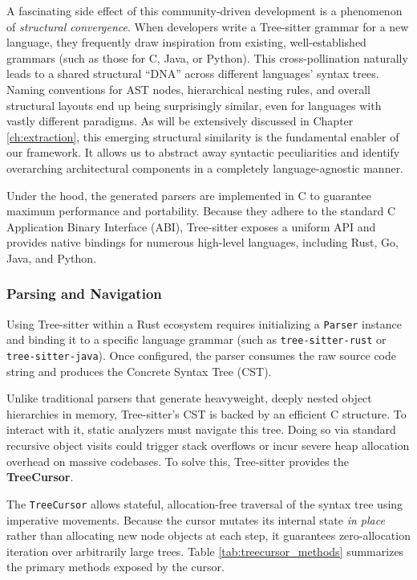 A fascinating side effect of this community-driven development is a
phenomenon of \textit{structural convergence}. When developers write a
Tree-sitter grammar for a new language, they frequently draw
inspiration from existing, well-established grammars (such as those
for C, Java, or Python). This cross-pollination naturally leads to a
shared structural ``DNA'' across different languages' syntax trees.
Naming conventions for AST nodes, hierarchical nesting rules, and
overall structural layouts end up being surprisingly similar, even for
languages with vastly different paradigms. As will be extensively
discussed in Chapter \ref{ch:extraction}, this emerging structural
similarity is the fundamental enabler of our framework. It allows us
to abstract away syntactic peculiarities and identify overarching
architectural components in a completely language-agnostic manner.

Under the hood, the generated parsers are implemented in C to
guarantee maximum performance and portability. Because they adhere to
the standard C Application Binary Interface (ABI), Tree-sitter
exposes a uniform API and provides native bindings for numerous
high-level languages, including Rust, Go, Java, and Python.

\subsubsection{Parsing and Navigation}

Using Tree-sitter within a Rust ecosystem requires initializing a
\texttt{Parser} instance and binding it to a specific language grammar
(such as \texttt{tree-sitter-rust} or \texttt{tree-sitter-java}).
Once configured, the parser consumes the raw source code string and
produces the Concrete Syntax Tree (CST).

Unlike traditional parsers that generate heavyweight, deeply nested
object hierarchies in memory, Tree-sitter's CST is backed by an
efficient C structure. To interact with it, static analyzers must
navigate this tree. Doing so via standard recursive object visits
could trigger stack overflows or incur severe heap allocation overhead
on massive codebases. To solve this, Tree-sitter provides the
\textbf{TreeCursor}.

The \texttt{TreeCursor} allows stateful, allocation-free traversal of
the syntax tree using imperative movements. Because the cursor mutates
its internal state \textit{in place} rather than allocating new node
objects at each step, it guarantees zero-allocation iteration over
arbitrarily large trees. Table \ref{tab:treecursor_methods} summarizes
the primary methods exposed by the cursor.

